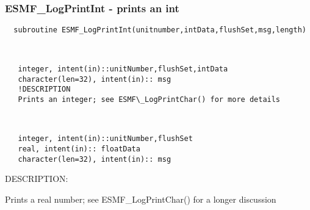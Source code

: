 \mbox{}\hrulefill\ 
 
\subsubsection [ESMF\_LogPrintInt] {ESMF\_LogPrintInt - prints an int}


  
\begin{verbatim}  subroutine ESMF_LogPrintInt(unitnumber,intData,flushSet,msg,length)\end{verbatim}
 
 
\mbox{}\hrulefill\ 
 

\begin{verbatim}   integer, intent(in)::unitNumber,flushSet,intData
   character(len=32), intent(in):: msg
   !DESCRIPTION
   Prints an integer; see ESMF\_LogPrintChar() for more details\end{verbatim}
 
 
\mbox{}\hrulefill\ 
 

\begin{verbatim}   integer, intent(in)::unitNumber,flushSet
   real, intent(in):: floatData
   character(len=32), intent(in):: msg\end{verbatim}
{\sf DESCRIPTION:\\ }


   Prints a real number; see ESMF\_LogPrintChar() for a longer discussion
  
